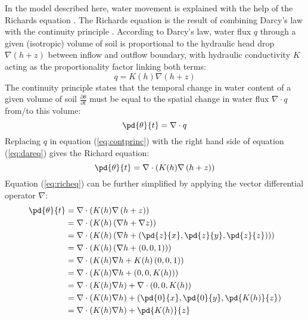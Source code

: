 In the model described here, water movement is explained with the help of the Richards equation \parencite{richards_capillary_1931}.  The Richards equation is the result of combining Darcy’s law with the continuity principle \parencite{hillel_environmental_1998}.  According to Darcy’s law, water flux $q$ through a given (isotropic) volume of soil is proportional to the hydraulic head drop $\nabla \left( h + z \right)$ between inflow and outflow boundary, with hydraulic conductivity $K$ acting as the proportionality factor linking both terms:
\begin{equation}
  \label{eq:dareq}
  q = K(h) \nabla \left( h + z \right)
\end{equation}
The continuity principle states that the temporal change in water content of a given volume of soil $\frac{\partial \theta}{\partial t}$ must be equal to the spatial change in water flux $\nabla \cdot q$ from/to this volume:
\begin{equation}
  \label{eq:contprinc}
  \pd{\theta}{t}  = \nabla \cdot q
\end{equation}
Replacing $q$ in equation (\ref{eq:contprinc}) with the right hand side of equation (\ref{eq:dareq}) gives the Richard equation:
\begin{equation}
  \label{eq:richeq}
  \pd{\theta}{t} = \nabla \cdot \left( K(h) \nabla \left( h + z \right) \right)
\end{equation}
Equation (\ref{eq:richeq}) can be further simplified by applying the vector differential operator $\nabla$: %
\begin{align*}
  \pd{\theta}{t} &= \nabla \cdot \left( K(h) \nabla \left( h + z \right) \right) \\
                                     &= \nabla \cdot\left( K(h) \left(\nabla h + \nabla z \right) \right) \\
                                     &= \nabla \cdot\left( K(h) \left(\nabla h + \left(\pd{z}{x},\pd{z}{y},\pd{z}{z} \right) \right) \right) \\
                                     &= \nabla \cdot\left( K(h) \left(\nabla h + \left(0,0,1 \right) \right) \right) \\
                                     &= \nabla \cdot \left(K(h) \nabla h + K(h) \left(0,0,1 \right) \right) \\
                                     &= \nabla \cdot \left(K(h) \nabla h + \left(0,0,K(h) \right) \right) \\
                                     &= \nabla \cdot \left( K(h) \nabla h \right) + \nabla \cdot \left(0,0,K(h) \right) \\
                                     &= \nabla \cdot \left( K(h) \nabla h \right) + \left(\pd{0}{x},\pd{0}{y},\pd{K(h)}{z}\right) \\
                                     &= \nabla \cdot \left( K(h) \nabla h \right) + \pd{K(h)}{z}
\end{align*}
